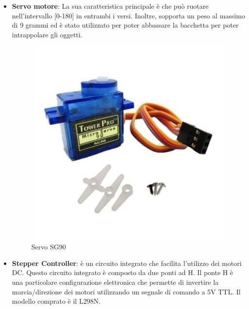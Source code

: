 \documentclass[a4paper,12pt,italian]{article}
\begin{document}
\begin{itemize}
	\item \textbf{Servo motore}: La sua caratteristica principale è che può ruotare nell’intervallo [0-180] in entrambi i versi. Inoltre, sopporta un peso al massimo di 9 grammi ed è stato utilizzato per poter abbassare la bacchetta per poter intrappolare gli oggetti.
 		\begin{figure}[H]
			\begin{center}
			\includegraphics[scale=0.2]{servo}
			\caption{Servo SG90}
			\label{Fig: servo}
			\end{center}
		\end{figure}
	\item \textbf{Stepper Controller}: è un circuito integrato che facilita l'utilizzo dei motori DC. Questo circuito integrato è composto da due ponti ad H. Il ponte H è una particolare configurazione elettronica che permette di invertire la marcia/direzione dei motori utilizzando un segnale di comando a 5V TTL. Il modello comprato è il L298N.
		\begin{figure}[H]
			\begin{center}

\end{center}
\end{figure}
\end{itemize}
\end{document}
